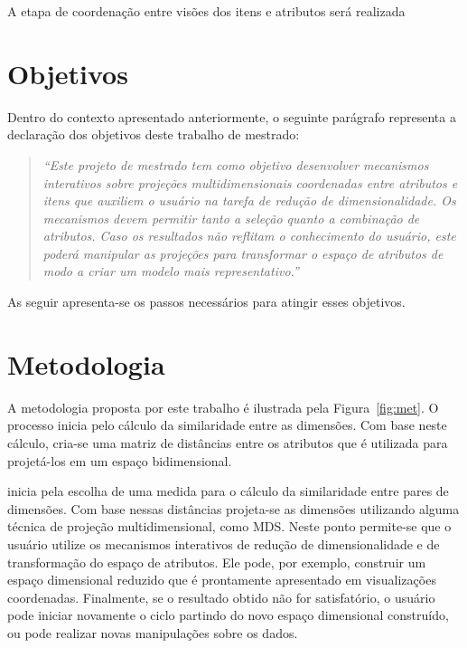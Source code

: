 A etapa de coordenação entre visões dos itens e atributos será realizada 


\section{Objetivos}



Dentro do contexto apresentado anteriormente, o seguinte parágrafo representa a declaração dos objetivos deste trabalho de mestrado:

\begin{quote}
    \emph{``Este projeto de mestrado tem como objetivo desenvolver mecanismos interativos sobre projeções multidimensionais coordenadas entre atributos e itens que auxiliem o usuário na tarefa de redução de dimensionalidade. Os mecanismos devem permitir tanto a seleção quanto a combinação de atributos. Caso os resultados não reflitam o conhecimento do usuário, este poderá manipular as projeções para transformar o espaço de atributos de modo a criar um modelo mais representativo.''}
\end{quote}

As seguir apresenta-se os passos necessários para atingir esses objetivos.

\section{Metodologia}

A metodologia proposta por este trabalho é ilustrada pela Figura~\ref{fig:met}. O processo inicia pelo cálculo da similaridade entre as dimensões. Com base neste cálculo, cria-se uma matriz de distâncias entre os atributos que é utilizada para projetá-los em um espaço bidimensional.   

inicia pela escolha de uma medida para o cálculo da similaridade entre pares de dimensões. Com base nessas distâncias projeta-se as dimensões utilizando alguma técnica de projeção multidimensional, como MDS. Neste ponto permite-se que o usuário utilize os mecanismos interativos de redução de dimensionalidade e de transformação do espaço de atributos. Ele pode, por exemplo, construir um espaço dimensional reduzido que é prontamente apresentado em visualizações coordenadas. Finalmente, se o resultado obtido não for satisfatório, o usuário pode iniciar novamente o ciclo partindo do novo espaço dimensional construído, ou pode realizar novas manipulações sobre os dados.

